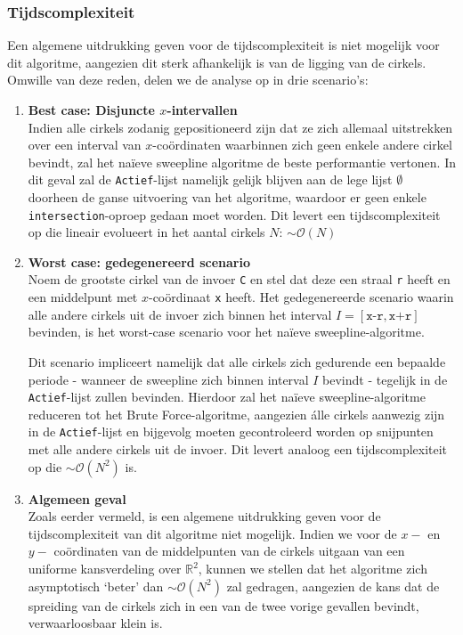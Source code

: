 \documentclass[12pt]{article}
\begin{document}
\subsubsection{Tijdscomplexiteit}\label{sec:naiveSL}
Een algemene uitdrukking geven voor de tijdscomplexiteit is niet mogelijk voor dit algoritme, aangezien dit sterk afhankelijk is van de ligging van de cirkels. Omwille van deze reden, delen we de analyse op in drie scenario's:
\begin{enumerate}
	\item \textbf{Best case: Disjuncte $ x $-intervallen}\\
		Indien alle cirkels zodanig gepositioneerd zijn dat ze zich allemaal uitstrekken over een interval van $ x $-coördinaten waarbinnen zich geen enkele andere cirkel bevindt, zal het naïeve sweepline algoritme de beste performantie vertonen. In dit geval zal de \texttt{Actief}-lijst namelijk gelijk blijven aan de lege lijst $\emptyset$ doorheen de ganse uitvoering van het algoritme, waardoor er geen enkele \texttt{intersection}-oproep gedaan moet worden. Dit levert een tijdscomplexiteit op die lineair evolueert in het aantal cirkels $ N $: $ \sim \mathcal{O}(N) $  
	\item \textbf{Worst case: gedegenereerd scenario}\\
		Noem de grootste cirkel van de invoer \texttt{C} en stel dat deze een straal \texttt{r} heeft en een middelpunt met $ x $-coördinaat \texttt{x} heeft. Het gedegenereerde scenario waarin alle andere cirkels uit de invoer zich binnen het interval $I = \left[\texttt{x-r}, \texttt{x+r}\right] $ bevinden, is het worst-case scenario voor het naïeve sweepline-algoritme.
		
		 Dit scenario impliceert namelijk dat alle cirkels zich gedurende een bepaalde periode - wanneer de sweepline zich binnen interval $ I $ bevindt - tegelijk in de \texttt{Actief}-lijst zullen bevinden. Hierdoor zal het naïeve sweepline-algoritme reduceren tot het Brute Force-algoritme, aangezien álle cirkels aanwezig zijn in de \texttt{Actief}-lijst en bijgevolg moeten gecontroleerd worden op snijpunten met alle andere cirkels uit de invoer. Dit levert analoog een tijdscomplexiteit op die $ \sim \mathcal{O}(N^2) $ is.
 \item \textbf{Algemeen geval}\\%
 		Zoals eerder vermeld, is een algemene uitdrukking geven voor de tijdscomplexiteit van dit algoritme niet mogelijk. Indien we voor de $ x- $ en $ y- $ coördinaten van de middelpunten van de cirkels uitgaan van een uniforme kansverdeling over $ \mathbb{R}^2 $, kunnen we stellen dat het algoritme zich asymptotisch `beter' dan $ \sim \mathcal{O}(N^2) $ zal gedragen, aangezien de kans dat de spreiding van de cirkels zich in een van de twee vorige gevallen bevindt, verwaarloosbaar klein is.
\end{enumerate}
\end{document}
